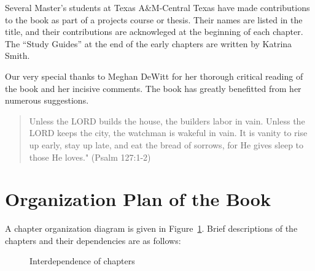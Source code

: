 Several Master's students at Texas A\&M-Central Texas have made contributions to the book as part of a projects course or thesis. Their names are listed in the title, and their contributions are acknowleged at the beginning of each chapter. The ``Study Guides'' at the end of the early chapters are written by Katrina Smith. 

Our very special thanks to Meghan DeWitt for her thorough critical reading of the book and her incisive comments. The book has greatly benefitted from her numerous suggestions.
\medskip 

\begin{quote}
Unless the LORD builds the house, the builders labor in vain. Unless the LORD keeps the city, the watchman is wakeful in vain.  It is vanity to rise up early, stay up late, and eat the bread of sorrows, for He gives sleep to those He loves."  (Psalm 127:1-2)
\end{quote}

\chapter*{Organization Plan of the Book}\label{chap:Org}
A chapter organization diagram is given in Figure~\ref{fig:organization}. Brief descriptions of the chapters and their dependencies are as follows:
\begin{figure}[htb]
	  \caption{\label{fig:organization} Interdependence of chapters}
\end{figure}

